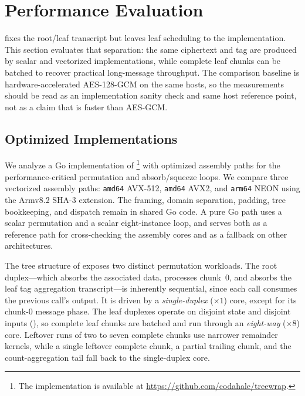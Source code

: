 \section{Performance Evaluation}
\label{sec:performance}

\TW{} fixes the root/leaf transcript but leaves leaf scheduling to the
implementation. This section evaluates that separation: the same ciphertext and
tag are produced by scalar and vectorized implementations, while complete leaf
chunks can be batched to recover practical long-message throughput. The
comparison baseline is hardware-accelerated AES-128-GCM on the same hosts, so
the measurements should be read as an implementation sanity check and
same host reference point, not as a claim that \TW{} is faster than AES-GCM.

\subsection{Optimized Implementations}
\label{sec:impl}

We analyze a Go implementation of \TW{}\footnote{The implementation is available
at \url{https://github.com/codahale/treewrap}.} with optimized assembly paths
for the performance-critical permutation and absorb/squeeze loops. We
compare three vectorized assembly paths: \texttt{amd64} AVX-512,
\texttt{amd64} AVX2, and \texttt{arm64} NEON using the Armv8.2 SHA-3
extension. The framing, domain separation, padding, tree bookkeeping, and
dispatch remain in shared Go code. A pure Go path uses a scalar permutation
and a scalar eight-instance loop, and serves both as a reference path for
cross-checking the assembly cores and as a fallback on other architectures.

The tree structure of \TW{} exposes two distinct permutation workloads. The
root duplex---which absorbs the associated data, processes chunk~$0$, and
absorbs the leaf tag aggregation transcript---is inherently sequential, since
each call consumes the previous call's output. It is driven by a
\emph{single-duplex} ($\times 1$) core, except for its chunk-$0$ message phase.
The leaf duplexes operate on disjoint state and disjoint inputs
(), so complete leaf chunks are batched and run through an
\emph{eight-way} ($\times 8$) core. Leftover runs of two to seven complete
chunks use narrower remainder kernels, while a single leftover complete chunk,
a partial trailing chunk, and the count-aggregation tail fall back to the
single-duplex core.

